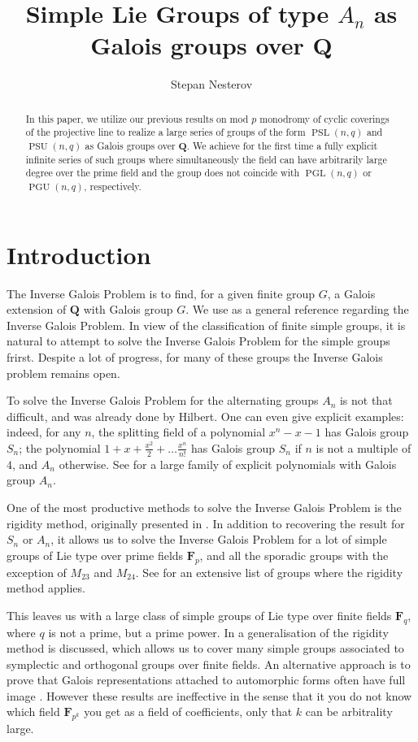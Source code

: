 \documentclass{article}
\theoremstyle{definition}
\DeclareMathOperator{\PGL}{\mathrm{PGL}}
\DeclareMathOperator{\PGU}{\mathrm{PGU}}
\DeclareMathOperator{\PSL}{\mathrm{PSL}}
\DeclareMathOperator{\PSU}{\mathrm{PSU}}
\begin{document}
	\author{Stepan Nesterov}
	\title{Simple Lie Groups of type $A_n$ as Galois groups over $\mathbf{Q}$}
	\maketitle
	\begin{abstract}
		In this paper, we utilize our previous results on mod $p$ monodromy of cyclic coverings of the projective line to realize a large series of groups of the form $\PSL(n,q)$ and $\PSU(n,q)$ as Galois groups over $\mathbf{Q}$. We achieve for the first time a fully explicit infinite series of such groups where simultaneously the field can have arbitrarily large degree over the prime field and the group does not coincide with $\PGL(n,q)$ or $\PGU(n,q)$, respectively. 
	\end{abstract}
	\section{Introduction}
	The Inverse Galois Problem is to find, for a given finite group $G$, a Galois extension of $\mathbf{Q}$ with Galois group $G$. We use \cite{malle} as a general reference regarding the Inverse Galois Problem. In view of the classification of finite simple groups, it is natural to attempt to solve the Inverse Galois Problem for the simple groups frirst. Despite a lot of progress, for many of these groups the Inverse Galois problem remains open. \par 
	To solve the Inverse Galois Problem for the alternating groups $A_n$ is not that difficult, and was already done by Hilbert. One can even give explicit examples: indeed, for any $n$, the splitting field of a polynomial $x^n - x - 1$ has Galois group $S_n$; the polynomial $1+x+\frac{x^2}{2} + \ldots \frac{x^n}{n!}$ has Galois group $S_n$ if $n$ is not a multiple of $4$, and $A_n$ otherwise. See \cite{alternating} for a large family of explicit polynomials with Galois group $A_n$. \par 
	One of the most productive methods to solve the Inverse Galois Problem is the rigidity method, originally presented in \cite{rigidity}. In addition to recovering the result for $S_n$ or $A_n$, it allows us to solve the Inverse Galois Problem for a lot of simple groups of Lie type over prime fields $\mathbf{F}_p$, and all the sporadic groups with the exception of $M_{23}$ and $M_{24}$. See \cite[Chapter II]{malle} for an extensive list of groups where the rigidity method applies. \par 
	This leaves us with a large class of simple groups of Lie type over finite fields $\mathbf{F}_q$, where $q$ is not a prime, but a prime power. In \cite[Chapter III.10]{malle} a generalisation of the rigidity method is discussed, which allows us to cover many simple groups associated to symplectic and orthogonal groups over finite fields. An alternative approach is to prove that Galois representations attached to automorphic forms often have full image \cite{khare} \cite{wiese}. However these results are ineffective in the sense that it you do not know which field $\mathbf{F}_{p^k}$ you get as a field of coefficients, only that $k$ can be arbitrality large. \par 
\end{document}
